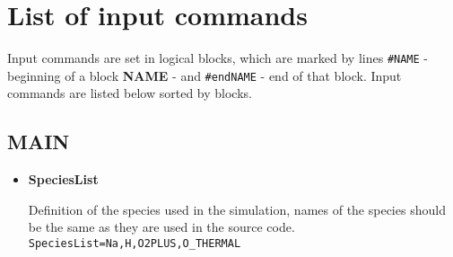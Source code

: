 %
%

\chapter{List of input commands}

Input commands are set in logical blocks, which are
marked by lines \texttt{\#NAME} - beginning of 
a block {\bf NAME} - and \texttt{\#endNAME} - end
of that block. Input commands are listed below 
sorted by blocks.

\section{MAIN}

\begin{itemize}

\item {\bf SpeciesList}

Definition of the species used in the simulation, names of the species should
be the same as they are used in the source code. 
\\\texttt{SpeciesList=Na,H,O2PLUS,O_THERMAL}


\end{itemize}

